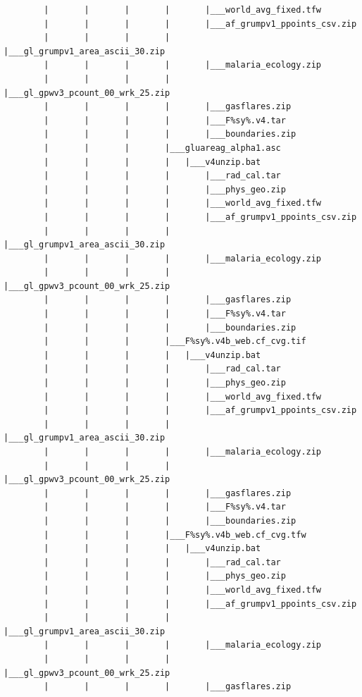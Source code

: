 \documentclass[]{book}
\begin{document}
\begin{verbatim}
        |       |       |       |       |___world_avg_fixed.tfw
        |       |       |       |       |___af_grumpv1_ppoints_csv.zip
        |       |       |       |       |___gl_grumpv1_area_ascii_30.zip
        |       |       |       |       |___malaria_ecology.zip
        |       |       |       |       |___gl_gpwv3_pcount_00_wrk_25.zip
        |       |       |       |       |___gasflares.zip
        |       |       |       |       |___F%sy%.v4.tar
        |       |       |       |       |___boundaries.zip
        |       |       |       |___gluareag_alpha1.asc
        |       |       |       |   |___v4unzip.bat
        |       |       |       |       |___rad_cal.tar
        |       |       |       |       |___phys_geo.zip
        |       |       |       |       |___world_avg_fixed.tfw
        |       |       |       |       |___af_grumpv1_ppoints_csv.zip
        |       |       |       |       |___gl_grumpv1_area_ascii_30.zip
        |       |       |       |       |___malaria_ecology.zip
        |       |       |       |       |___gl_gpwv3_pcount_00_wrk_25.zip
        |       |       |       |       |___gasflares.zip
        |       |       |       |       |___F%sy%.v4.tar
        |       |       |       |       |___boundaries.zip
        |       |       |       |___F%sy%.v4b_web.cf_cvg.tif
        |       |       |       |   |___v4unzip.bat
        |       |       |       |       |___rad_cal.tar
        |       |       |       |       |___phys_geo.zip
        |       |       |       |       |___world_avg_fixed.tfw
        |       |       |       |       |___af_grumpv1_ppoints_csv.zip
        |       |       |       |       |___gl_grumpv1_area_ascii_30.zip
        |       |       |       |       |___malaria_ecology.zip
        |       |       |       |       |___gl_gpwv3_pcount_00_wrk_25.zip
        |       |       |       |       |___gasflares.zip
        |       |       |       |       |___F%sy%.v4.tar
        |       |       |       |       |___boundaries.zip
        |       |       |       |___F%sy%.v4b_web.cf_cvg.tfw
        |       |       |       |   |___v4unzip.bat
        |       |       |       |       |___rad_cal.tar
        |       |       |       |       |___phys_geo.zip
        |       |       |       |       |___world_avg_fixed.tfw
        |       |       |       |       |___af_grumpv1_ppoints_csv.zip
        |       |       |       |       |___gl_grumpv1_area_ascii_30.zip
        |       |       |       |       |___malaria_ecology.zip
        |       |       |       |       |___gl_gpwv3_pcount_00_wrk_25.zip
        |       |       |       |       |___gasflares.zip

\end{verbatim}
\end{document}
